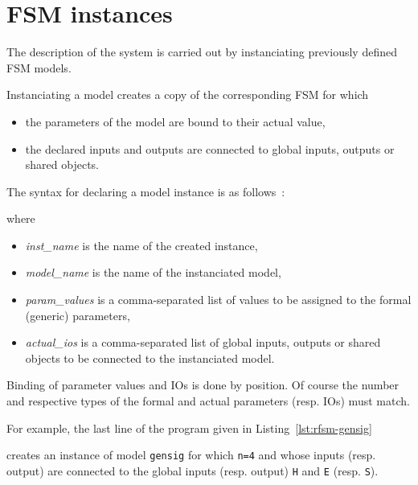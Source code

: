 \section{FSM instances}
\label{sec:fsm-instances}

The description of the system is carried out by instanciating
previously defined FSM models.

\medskip
Instanciating a model creates a copy of the corresponding FSM for which
\begin{itemize}
\item the parameters of the model are bound to their actual value,
\item the declared inputs and outputs are connected to global inputs, outputs or shared
  objects.
\end{itemize}

\medskip
The syntax for declaring a model instance is as follows~:

\begin{center}
\end{center}

where
\begin{itemize}
\item \emph{inst\_name} is the name of the created instance,
\item \emph{model\_name} is the name of the instanciated model,
\item \emph{param\_values} is a comma-separated list of values to be assigned to the formal
  (generic) parameters,
\item \emph{actual\_ios} is a comma-separated list of global inputs, outputs or shared objects to be
  connected to the instanciated model.
\end{itemize}

Binding of parameter values and IOs is done by position. Of course the number and respective types
of the formal and actual parameters (resp. IOs) must match.

\medskip
For example, the last line of the program given in Listing~\ref{lst:rfsm-gensig}

\begin{center}
\end{center}

creates an instance of model \verb|gensig| for which \verb|n=4| and whose inputs (resp. output) are
connected to the global inputs (resp. output) \texttt{H} and \texttt{E} (resp. \texttt{S}).

